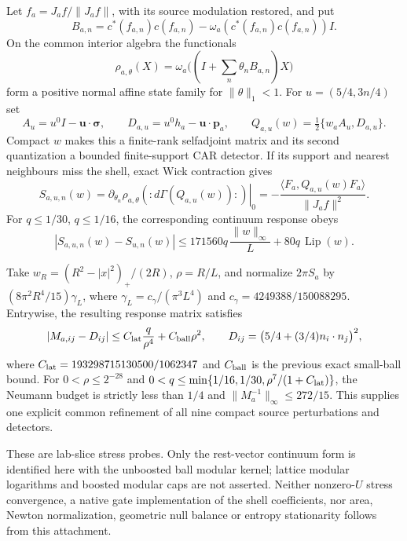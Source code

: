 Let $f_a=J_af/\|J_af\|$, with its source modulation restored, and put
\[
 B_{a,n}=c^*(f_{a,n})c(f_{a,n})
       -\omega_a(c^*(f_{a,n})c(f_{a,n}))I.
\]
On the common interior algebra the functionals
\[
 \rho_{a,\theta}(X)=\omega_a\bigl((I+\sum_n\theta_nB_{a,n})X\bigr)
\]
form a positive normal affine state family for $\|\theta\|_1<1$.
For $u=(5/4,3n/4)$ set
\[
 A_u=u^0I-\boldsymbol u\cdot\boldsymbol\sigma,\qquad
 D_{a,u}=u^0h_a-\boldsymbol u\cdot\boldsymbol p_a,\qquad
 Q_{a,u}(w)=\tfrac12\{w_aA_u,D_{a,u}\}.
\]
Compact $w$ makes this a finite-rank selfadjoint matrix and its
second quantization a bounded finite-support CAR detector. If its support
and nearest neighbours miss the shell, exact Wick contraction gives
\[
 S_{a,u,n}(w)
 =\left.\partial_{\theta_n}\rho_{a,\theta}
       (:d\Gamma(Q_{a,u}(w)):)\right|_0
 =-\frac{\langle F_a,Q_{a,u}(w)F_a\rangle}{\|J_af\|^2}.
\]
For $q\leq1/30$, $q\leq1/16$, the corresponding continuum response obeys
\[
 |S_{a,u,n}(w)-S_{u,n}(w)|
 \leq171560q\,\frac{\|w\|_\infty}{L}
       +80q\,\operatorname{Lip}(w).
\]

Take $w_R=(R^2-|x|^2)_+/(2R)$, $\rho=R/L$, and normalize $2\pi S_a$
by $(8\pi^2R^4/15)\gamma_L$, where
$\gamma_L=c_\gamma/(\pi^3L^4)$ and
$c_\gamma=4249388/150088295$. Entrywise, the resulting response matrix
satisfies
\[
 |M_{a,ij}-D_{ij}|\leq C_{\rm lat}\frac q{\rho^4}
                           +C_{\rm ball}\rho^2,\qquad
 D_{ij}=\bigl(5/4+(3/4)n_i\cdot n_j\bigr)^2,
\]
where $C_{\rm lat}=193298715130500/1062347$ and $C_{\rm ball}$ is the
previous exact small-ball bound. For
$0<\rho\leq2^{-28}$ and
$0<q\leq\min\{1/16,1/30,\rho^7/(1+C_{\rm lat})\}$,
the Neumann budget is strictly less than $1/4$ and
$\|M_a^{-1}\|_\infty\leq272/15$. This supplies one explicit common
refinement of all nine compact source perturbations and detectors.

These are lab-slice stress probes. Only the rest-vector continuum form
is identified here with the unboosted ball modular kernel; lattice
modular logarithms and boosted modular caps are not asserted. Neither
nonzero-$U$ stress convergence, a native gate implementation of the shell
coefficients, nor area, Newton normalization, geometric null balance or
entropy stationarity follows from this attachment.
